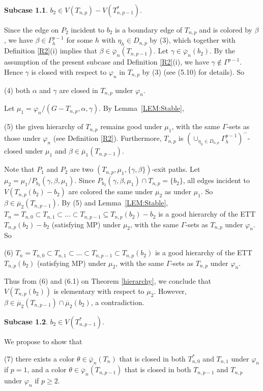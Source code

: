 \documentclass[11pt]{article}
\newcommand{\phibar}{\overline{\varphi}}
\begin{document}
{\bf Subcase 1.1}.  $b_2\in V(T_{n,p})-V(T_{n,p-1}^*)$.	
	
Since the edge on $P_2$ incident to $b_2$ is a boundary edge of $T_{n,p}$ and is colored by $\beta$, we have  
$\beta \in \Gamma^{p-1}_h$ for some $h$ with $\eta_h\in D_{n,p}$ by (3), which together with Definition \ref{R2}(i)
implies that $\beta \in \phibar_n(T_{n,p-1})$. Let $\gamma\in \overline{\varphi}_n(b_2)$. By the assumption of
the present subcase and Definition \ref{R2}(i), we have $\gamma\notin \Gamma^{p-1}$. Hence $\gamma$ is closed 
with respect to $\varphi_n$ in $T_{n,p}$ by (3) (see (5.10) for details).  So 

(4) both $\alpha$ and $\gamma$ are closed in $T_{n,p}$ under $\varphi_n$. 

Let $\mu_1=\varphi_n/(G-T_{n,p},\alpha,\gamma)$. By Lemma~\ref{LEM:Stable}, 

(5) the given hierarchy of $T_{n,p}$ remains good under $\mu_1$, with the same $\Gamma$-sets as those under $\varphi_n$  
(see Definition \ref{R2}). Furthermore, $T_{n,p}$ is $(\cup_{\eta_h\in D_{n,p}}\Gamma^{p-1}_h)^-$-closed under $\mu_1$ and $\beta \in \overline{\mu}_1(T_{n,p-1})$. 

Note that $P_1$ and $P_2$ are two $(T_{n,p}, \mu_1, \{\gamma, \beta\})$-exit paths.
Let $\mu_2=\mu_1/P_{b_2}(\gamma, \beta, \mu_1)$. Since $P_{b_2}(\gamma, \beta, \mu_1) \cap T_{n,p}=\{b_2\}$,  all edges incident to 
$V(T_{n,p}(b_2)-b_2)$ are colored the same under $\mu_2$ as under $\mu_1$. So $\beta \in \overline{\mu}_2(T_{n,p-1})$. By (5) and Lemma~\ref{LEM:Stable},
$T_n=T_{n,0} \subset T_{n,1}  \subset \ldots \subset T_{n,p-1} \subseteq T_{n,p}(b_2)-b_2$ is a good hierarchy 
of the ETT $T_{n,p}(b_2)-b_2$ (satisfying MP) under $\mu_2$, with the same $\Gamma$-sets as $T_{n,p}$ under $\varphi_n$. So

(6) $T_n=T_{n,0} \subset T_{n,1}  \subset \ldots \subset T_{n,p-1} \subset T_{n,p}(b_2)$ is a good hierarchy 
of the ETT $T_{n,p}(b_2)$ (satisfying MP) under $\mu_2$, with the same $\Gamma$-sets as $T_{n,p}$ under $\varphi_n$. 

Thus from (6) and (6.1) on Theorem \ref{hierarchy}, we conclude that $V(T_{n,p}(b_2))$ is elementary with respect to 
$\mu_2$. However, $\beta\in \overline{\mu}_2(T_{n,p-1}) \cap \overline{\mu}_2(b_2)$, a contradiction.
	
{\bf Subcase 1.2}. $b_2\in V(T_{n,p-1}^*)$.			
	
We propose to show that

(7) there exists a color $\theta \in\overline{\varphi}_n(T_n)$ that is closed in both $T_{n,0}^*$ and $T_{n,1}$ under 
$\varphi_n$ if $p=1$, and a color $\theta \in\overline{\varphi}_n(T_{n,p-1})$ that is closed in both $T_{n,p-1}$ 
and $T_{n,p}$ under $\varphi_n$ if $p\ge 2$.
\end{document}
